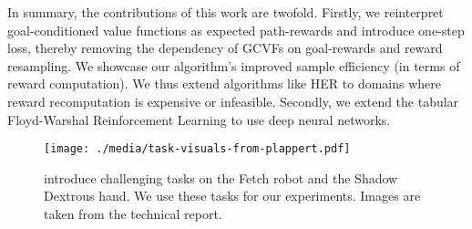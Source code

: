 In summary, the  contributions of this work are twofold. Firstly, we
reinterpret goal-conditioned value functions as expected path-rewards
and introduce one-step loss, thereby removing the dependency of GCVFs on
goal-rewards and reward resampling. We showcase our algorithm's
improved sample efficiency (in  terms of reward computation). We thus
extend algorithms like HER to domains where reward recomputation is
expensive or infeasible.
Secondly, we extend the tabular Floyd-Warshal Reinforcement Learning to
use deep neural networks. 



%
\begin{figure}%
  \texttt{[image: ./media/task-visuals-from-plappert.pdf]}%
  \caption{\citet{plappert2018multi} introduce challenging tasks on the
Fetch robot and the Shadow Dextrous hand. We use these tasks for our experiments.
    Images are taken from the technical report.}%
  \label{fig:envs}%
\end{figure}%
% 
